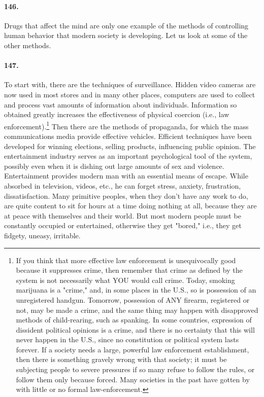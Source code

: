 \documentclass[12pt]{book}
\begin{document}
\paragraph{146.} Drugs that affect the mind are only one example of the methods of controlling human behavior that modern society is developing. Let us look at some of the other methods.


\paragraph{147.} To start with, there are the techniques of surveillance. Hidden video cameras are now used in most stores and in many other places, computers are used to collect and process vast amounts of information about individuals. Information so obtained greatly increases the effectiveness of physical coercion (i.e., law enforcement).\footnote{If you think that more effective law enforcement is unequivocally good because it suppresses crime, then remember that crime as defined by the system is not necessarily what YOU would call crime. Today, smoking marijuana is a "crime," and, in some places in the U.S., so is possession of an unregistered handgun. Tomorrow, possession of ANY firearm, registered or not, may be made a crime, and the same thing may happen with disapproved methods of child-rearing, such as spanking. In some countries, expression of dissident political opinions is a crime, and there is no certainty that this will never happen in the U.S., since no constitution or political system lasts forever. If a society needs a large, powerful law enforcement establishment, then there is something gravely wrong with that society; it must be subjecting people to severe pressures if so many refuse to follow the rules, or follow them only because forced. Many societies in the past have gotten by with little or no formal law-enforcement.} Then there are the methods of propaganda, for which the mass communications media provide effective vehicles. Efficient techniques have been developed for winning elections, selling products, influencing public opinion. The entertainment industry serves as an important psychological tool of the system, possibly even when it is dishing out large amounts of sex and violence. Entertainment provides modern man with an essential means of escape. While absorbed in television, videos, etc., he can forget stress, anxiety, frustration, dissatisfaction. Many primitive peoples, when they don't have any work to do, are quite content to sit for hours at a time doing nothing at all, because they are at peace with themselves and their world. But most modern people must be constantly occupied or entertained, otherwise they get "bored," i.e., they get fidgety, uneasy, irritable.
\end{document}
